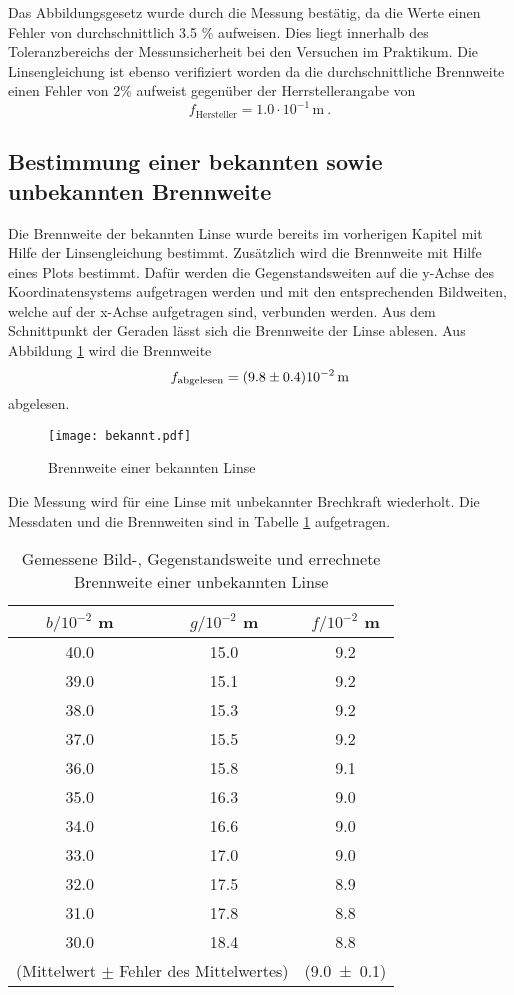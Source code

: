Das Abbildungsgesetz wurde durch die Messung bestätig, da die Werte einen Fehler von durchschnittlich 3.5 \% aufweisen. Dies liegt innerhalb des Toleranzbereichs der Messunsicherheit bei den Versuchen im Praktikum. Die Linsengleichung ist ebenso verifiziert worden da die durchschnittliche Brennweite einen Fehler von 2\% aufweist gegenüber der Herrstellerangabe von
\begin{equation}
  f_\text{Hersteller} = 1.0 \cdot 10^{-1} \, \text{m} \ .
  \label{eqn:fHer1}
\end{equation}
\subsection{Bestimmung einer bekannten sowie unbekannten Brennweite}
Die Brennweite der bekannten Linse wurde bereits im vorherigen Kapitel mit Hilfe der Linsengleichung bestimmt. Zusätzlich wird die Brennweite mit Hilfe eines Plots bestimmt. Dafür werden die Gegenstandsweiten auf die y-Achse des Koordinatensystems aufgetragen werden und mit den entsprechenden Bildweiten, welche auf der x-Achse aufgetragen sind, verbunden werden. Aus dem Schnittpunkt der Geraden lässt sich die Brennweite der Linse ablesen. Aus Abbildung \ref{fig:fibek} wird die Brennweite
\begin{equation}
  f_\text{abgelesen} = (\num{9.8 +- 0.4}) 10^{-2} \, \text{m}
  \label{eqn:fbek}
\end{equation}
abgelesen.
\begin{figure}
  \centering
  \texttt{[image: bekannt.pdf]}
  \caption{Brennweite einer bekannten Linse}
  \label{fig:fibek}
\end{figure}
Die Messung wird für eine Linse mit unbekannter Brechkraft wiederholt. Die Messdaten und die Brennweiten sind in Tabelle \ref{tab:funb} aufgetragen.
\begin{table}
  \centering
  \begin{tabular}{c c| c}
    \toprule
    $b/10^{-2}$ m & $g/10^{-2}$ m & $f/10^{-2}$ m\\
    \midrule
	40.0	& 15.0	& 9.2	\\
	39.0	& 15.1	& 9.2	\\
	38.0	& 15.3	& 9.2	\\
	37.0	& 15.5	& 9.2	\\
	36.0	& 15.8	& 9.1	\\
	35.0	& 16.3	& 9.0	\\
	34.0	& 16.6	& 9.0	\\
	33.0	& 17.0	& 9.0	\\
	32.0	& 17.5	& 8.9	\\
	31.0	& 17.8	& 8.8	\\
	30.0	& 18.4	& 8.8	\\
    \midrule
    	\multicolumn{2}{r|}{(Mittelwert $\pm$ Fehler des Mittelwertes)}&(\num {9.0 +- 0.1})\\
    \bottomrule
  \end{tabular}
  \caption{Gemessene Bild-, Gegenstandsweite und errechnete Brennweite einer unbekannten Linse}
  \label{tab:funb}
\end{table}
